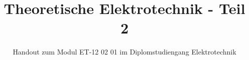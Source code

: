 

\title[Theoretische Elektrotechnik - Teil 2]{Theoretische Elektrotechnik - Teil 2}

\subtitle{Handout zum Modul ET-12 02 01 im Diplomstudiengang Elektrotechnik}

% 
% 

\maketitle

% 
% 


